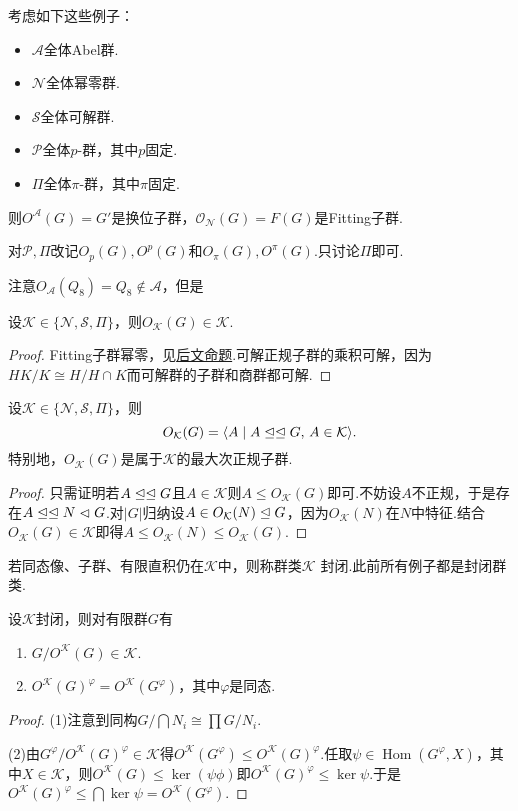 考虑如下这些例子：
\begin{itemize}
	\item $\mathcal{A}$\quad 全体Abel群.
	\item $\mathcal{N}$\quad 全体幂零群.
	\item $\mathcal{S}$\quad 全体可解群.
	\item $\mathcal{P}$\quad 全体$p$-群，其中$p$固定.
	\item $\Pi$\quad 全体$\pi$-群，其中$\pi$固定.
\end{itemize}

则$O^{\mathcal{A}}(G)=G'$是换位子群，$\mathcal{O}_{\mathcal{N}}(G)=F(G)$是{\heiti Fitting子群}.

对$\mathcal{P},\Pi$改记$O_p(G),O^p(G)$和$O_\pi(G),O^\pi(G)$.只讨论$\Pi$即可.

注意$O_{\mathcal{A}}(Q_8)=Q_8\notin\mathcal{A}$，但是
\begin{lemma*}
	设$\mathcal{K}\in\{\mathcal{N},\mathcal{S},\Pi\}$，则$O_{\mathcal{K}}(G)\in\mathcal{K}$.
\end{lemma*}
\begin{proof}
	Fitting子群幂零，见\hyperlink{prop:FittingSubgrp}{后文命题}.可解正规子群的乘积可解，因为$HK/K\cong H/H\cap K$而可解群的子群和商群都可解.
\end{proof}
\begin{prop}
	设$\mathcal{K}\in\{\mathcal{N},\mathcal{S},\Pi\}$，则
	\[
		O_{\mathcal{K}}(G)=\langle A\mid A\trianglelefteq\trianglelefteq G,\,A\in\mathcal{K}\rangle.
	\]
	特别地，$O_{\mathcal{K}}(G)$是属于$\mathcal{K}$的最大次正规子群.
\end{prop}
\begin{proof}
	只需证明若$A\trianglelefteq\trianglelefteq G$且$A\in\mathcal{K}$则$A\le O_{\mathcal{K}}(G)$即可.不妨设$A$不正规，于是存在$A\trianglelefteq\trianglelefteq N\vartriangleleft G$.对$|G|$归纳设$A\in O_{\mathcal{K}}(N)\trianglelefteq G$，因为$O_{\mathcal{K}}(N)$在$N$中特征.结合$O_{\mathcal{K}}(G)\in\mathcal{K}$即得$A\le O_{\mathcal{K}}(N)\le O_{\mathcal{K}}(G)$.
\end{proof}

若同态像、子群、有限直积仍在$\mathcal{K}$中，则称群类$\mathcal{K}$ {\heiti 封闭}.此前所有例子都是封闭群类.
\begin{prop}
	设$\mathcal{K}$封闭，则对有限群$G$有
	\begin{enumerate}
		\item $G/O^{\mathcal{K}}(G)\in\mathcal{K}$.
		\item $O^{\mathcal{K}}(G)^\varphi=O^{\mathcal{K}}(G^\varphi)$，其中$\varphi$是同态.
	\end{enumerate}
\end{prop}
\begin{proof}
	\hspace*{5.2pt}(1)注意到同构$G/\bigcap N_i\cong\prod G/N_i$.

	(2)由$G^\varphi/O^{\mathcal{K}}(G)^\varphi\in\mathcal{K}$得$O^{\mathcal{K}}(G^\varphi)\le O^{\mathcal{K}}(G)^\varphi$.任取$\psi\in\operatorname*{Hom}(G^\varphi,X)$，其中$X\in\mathcal{K}$，则$O^{\mathcal{K}}(G)\le\ker(\psi\phi)$即$O^{\mathcal{K}}(G)^\varphi\le\ker\psi$.于是$O^{\mathcal{K}}(G)^\varphi\le\bigcap\ker\psi=O^{\mathcal{K}}(G^\varphi)$.
\end{proof}

